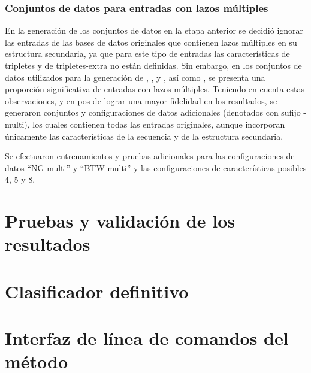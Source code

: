 \documentclass[12pt,bibliography=oldstyle,DIV=12,parskip=half-,titlepage]{scrartcl}
\begin{document}
\subsubsection{Conjuntos de datos para entradas con lazos múltiples}
En la generación de los conjuntos de datos en la etapa anterior se
decidió ignorar las entradas de las bases de datos originales que
contienen lazos múltiples en su estructura secundaria, ya que para
este tipo de entradas las características de tripletes y de
tripletes-extra no están definidas. Sin embargo, en los conjuntos de
datos utilizados para la generación de ,
,  y , así como
, se presenta una proporción significativa de entradas
con lazos múltiples. Teniendo en cuenta estas observaciones, y en pos
de lograr una mayor fidelidad en los resultados, se generaron
conjuntos y configuraciones de datos adicionales (denotados con sufijo
-multi), los cuales contienen todas las entradas originales, aunque incorporan
únicamente las características de la secuencia y de la estructura
secundaria.

Se efectuaron entrenamientos y pruebas adicionales para las
configuraciones de datos ``NG-multi'' y ``BTW-multi'' y las
configuraciones de características posibles 4, 5 y 8.
%
\section{Pruebas y validación de los resultados}

\section{Clasificador definitivo}

\section{Interfaz de línea de comandos del método}
\end{document}
